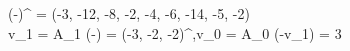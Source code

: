 (-\ell)^{\top} = (-3, -12, -8, -2, -4, -6, -14, -5, -2) \\ v_1 = A_1 \otimes (-\ell) = (-3, -2, -2)^{\top},\quad v_0 = A_0 \otimes (-v_1) = 3
